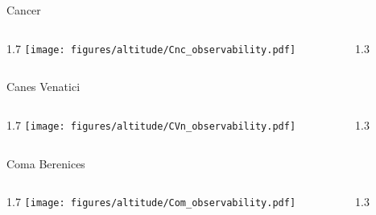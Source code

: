 \documentclass[final]{beamer}
\newlength{\colwidth}
\begin{document}
\begin{frame}[t]{}

  \Large{Cancer}
  \begin{columns}[T]
    \begin{column}{1.7\colwidth}
      \centering
      \texttt{[image: figures/altitude/Cnc\_observability.pdf]}
    \end{column}
    \begin{column}{1.3\colwidth}
      \Large
      
    \end{column}
  \end{columns}

  \Large{Canes Venatici}
  \begin{columns}[T]
    \begin{column}{1.7\colwidth}
      \centering
      \texttt{[image: figures/altitude/CVn\_observability.pdf]}
    \end{column}
    \begin{column}{1.3\colwidth}
      \Large
      
    \end{column}
  \end{columns}

  \Large{Coma Berenices}
  \begin{columns}[T]
    \begin{column}{1.7\colwidth}
      \centering
      \texttt{[image: figures/altitude/Com\_observability.pdf]}
    \end{column}
    \begin{column}{1.3\colwidth}
      \Large
      
    \end{column}
  \end{columns}
\end{frame}

\end{document}
